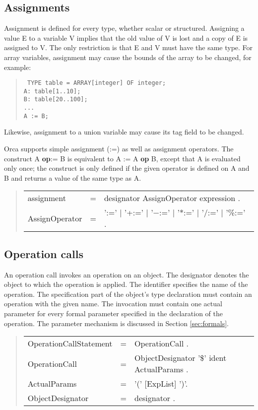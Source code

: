 \documentclass[10pt]{article}
\newenvironment{grammar}
{\begin{quote} \begin{tabular}{p{3.8cm} l l}}
{\end{tabular}\end{quote}}
\begin{document}
\subsection{Assignments}\label{sec:assignment}

Assignment is defined for every type, whether scalar or structured.
Assigning a value E to a variable V implies that the old value of V
is lost and a copy of E is assigned to V.
The only restriction is that E and V must have the same type.
For array variables, assignment may cause the bounds of the array to
be changed, for example:
\begin{quote}\tt
TYPE table = ARRAY[integer] OF integer; \\
A:~table[1..10]; \\
B:~table[20..100]; \\
...\\
A := B;
\end{quote}
Likewise, assignment to a union variable may cause its
tag field to be changed.

Orca supports simple assignment (:=) as well as assignment operators.
The construct A {\bf op}:= B is equivalent to A := A {\bf op} B,
except that A is evaluated only once;
the construct is only defined if the given operator is defined on A and B
and returns a value of the same type as A.
\begin{grammar}
assignment & = & designator AssignOperator expression . \\
AssignOperator & = & ':=' $|$ '+:=' $|$ '$-$:=' $|$ '*:=' $|$ '/:=' $|$ '\%:=' .
\end{grammar}
\subsection{Operation calls}\label{sec:op_calls}

An operation call invokes an operation on an object.
The designator denotes the object to which the operation is applied.
The identifier specifies the name of the operation.
The specification part of the object's type declaration must contain an
operation with the given name.
The invocation must contain one actual parameter for every formal parameter
specified in the declaration of the operation.
The parameter mechanism is discussed in Section \ref{sec:formals}.
\begin{grammar}
OperationCallStatement & = & OperationCall . \\
OperationCall & = & ObjectDesignator '\$' ident ActualParams . \\
ActualParams & = & '(' [ExpList] ')'. \\
ObjectDesignator & = & designator .
\end{grammar}
\end{document}
